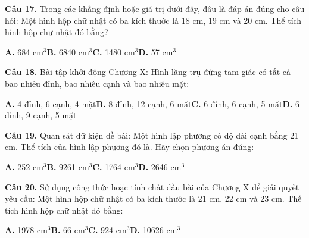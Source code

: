 \documentclass[11pt,a4paper]{article}
\begin{document}
\textbf{\color{primary} Câu 17.} Trong các khẳng định hoặc giá trị dưới đây, đâu là đáp án đúng cho câu hỏi: Một hình hộp chữ nhật có ba kích thước là 18 cm, 19 cm và 20 cm. Thể tích hình hộp chữ nhật đó bằng?\par
\hspace*{1.5em}\textbf{A.} 684 cm$^3$\quad\quad \textbf{B.} 6840 cm$^3$\quad\quad \textbf{C.} 1480 cm$^3$\quad\quad \textbf{D.} 57 cm$^3$\par\vspace{2pt}
\textbf{\color{primary} Câu 18.} Bài tập khởi động Chương X: Hình lăng trụ đứng tam giác có tất cả bao nhiêu đỉnh, bao nhiêu cạnh và bao nhiêu mặt:\par
\hspace*{1.5em}\textbf{A.} 4 đỉnh, 6 cạnh, 4 mặt\quad\quad \textbf{B.} 8 đỉnh, 12 cạnh, 6 mặt\quad\quad \textbf{C.} 6 đỉnh, 6 cạnh, 5 mặt\quad\quad \textbf{D.} 6 đỉnh, 9 cạnh, 5 mặt\par\vspace{2pt}
\textbf{\color{primary} Câu 19.} Quan sát dữ kiện đề bài: Một hình lập phương có độ dài cạnh bằng 21 cm. Thể tích của hình lập phương đó là. Hãy chọn phương án đúng:\par
\hspace*{1.5em}\textbf{A.} 252 cm$^3$\quad\quad \textbf{B.} 9261 cm$^3$\quad\quad \textbf{C.} 1764 cm$^3$\quad\quad \textbf{D.} 2646 cm$^3$\par\vspace{2pt}
\textbf{\color{primary} Câu 20.} Sử dụng công thức hoặc tính chất đầu bài của Chương X để giải quyết yêu cầu: Một hình hộp chữ nhật có ba kích thước là 21 cm, 22 cm và 23 cm. Thể tích hình hộp chữ nhật đó bằng:\par
\hspace*{1.5em}\textbf{A.} 1978 cm$^3$\quad\quad \textbf{B.} 66 cm$^3$\quad\quad \textbf{C.} 924 cm$^3$\quad\quad \textbf{D.} 10626 cm$^3$\par\vspace{2pt}
\end{document}
